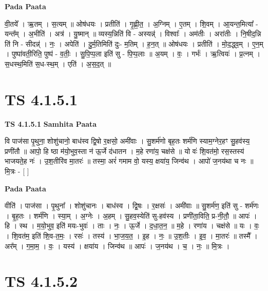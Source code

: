 \documentclass[17pt]{extarticle}
\begin{document}
\textbf{Pada Paata} \newline

वी॒तये᳚ । ऋ॒तम् । स॒त्यम् ॥ ओष॑धयः । प्रतीति॑ । गृ॒ह्णी॒त॒ । अ॒ग्निम् । ए॒तम् । शि॒वम् । आ॒यन्त॒मित्या᳚ - यन्त᳚म् । अ॒भीति॑ । अत्र॑ । यु॒ष्मान् ॥ व्यस्य॒न्निति॑ वि - अस्यन्न्॑ । विश्वाः᳚ । अम॑तीः । अरा॑तीः । नि॒षीद॒न्नि ति॑ नि - सीदन्न्॑ । नः॒ । अपेति॑ । दु॒र्म॒तिमिति॑ दुः- म॒तिम् । ह॒न॒त् ॥ ओष॑धयः । प्रतीति॑ । मो॒द॒द्ध्व॒म् । ए॒न॒म् । पुष्पा॑वती॒रिति॒ पुष्प॑ - व॒तीः॒ । सु॒पि॒प्प॒ला इति॑ सु - पि॒प्प॒लाः ॥ अ॒यम् । वः॒ । गर्भः॑ । ऋ॒त्वियः॑ । प्र॒त्नम् । स॒धस्थ॒मिति॑ स॒ध-स्थ॒म् । एति॑ । अ॒स॒द॒त् ॥  \newline




\section*{ TS 4.1.5.1 }

\textbf{TS 4.1.5.1 } \newline
\textbf{Samhita Paata} \newline

वि पाज॑सा पृ॒थुना॒ शोशु॑चानो॒ बाध॑स्व द्वि॒षो र॒क्षसो॒ अमी॑वाः । सु॒शर्म॑णो बृह॒तः शर्म॑णि स्याम॒ग्नेर॒हꣳ सु॒हव॑स्य॒ प्रणी॑तौ ॥ आपो॒ हि ष्ठा म॑यो॒भुव॒स्ता न॑ ऊ॒र्जे द॑धातन । म॒हे रणा॑य॒ चक्ष॑से ॥ यो वः॑ शि॒वत॑मो॒ रस॒स्तस्य॑ भाजयते॒ह नः॑ । उ॒श॒तीरि॑व मा॒तरः॑ ॥ तस्मा॒ अरं॑ गमाम वो॒ यस्य॒ क्षया॑य॒ जिन्व॑थ । आपो॑ ज॒नय॑था च नः ॥ मि॒त्रः - [  ] \newline

\textbf{Pada Paata} \newline

वीति॑ । पाज॑सा । पृ॒थुना᳚ । शोशु॑चानः । बाध॑स्व । द्वि॒षः । र॒क्षसः॑ । अमी॑वाः ॥ सु॒शर्म॑ण॒ इति॑ सु - शर्म॑णः । बृ॒ह॒तः । शर्म॑णि । स्या॒म् । अ॒ग्नेः । अ॒हम् । सु॒हव॒स्येति॑ सु-हव॑स्य । प्रणी॑ता॒विति॒ प्र-नी॒तौ॒ ॥ आपः॑ । हि । स्थ । म॒यो॒भुव॒ इति॑ मयः-भुवः॑ । ताः । नः॒ । ऊ॒र्जे । द॒धा॒त॒न॒ ॥ म॒हे । रणा॑य । चक्ष॑से ॥ यः । वः॒ । शि॒वत॑म॒ इति॑ शि॒व-त॒मः॒ । रसः॑ । तस्य॑ । भा॒ज॒य॒त॒ । इ॒ह । नः॒ ॥ उ॒श॒तीः । इ॒व॒ । मा॒तरः॑ ॥ तस्मै᳚ । अर᳚म् । ग॒मा॒म॒ । वः॒ । यस्य॑ । क्षया॑य । जिन्व॑थ ॥ आपः॑ । ज॒नय॑थ । च॒ । नः॒ ॥ मि॒त्रः ।  \newline




\section*{ TS 4.1.5.2 }
\end{document}
